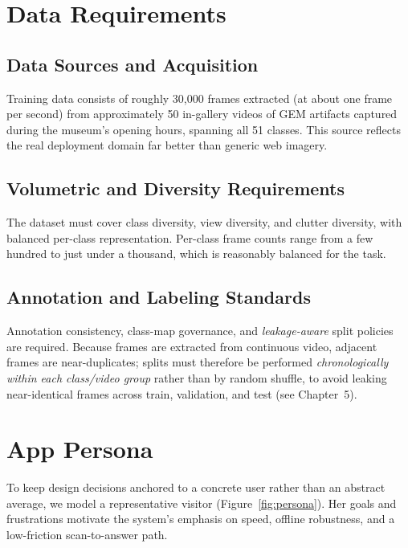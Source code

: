 \FloatBarrier
\section{Data Requirements}

\subsection{Data Sources and Acquisition}
Training data consists of roughly 30{,}000 frames extracted (at about one frame per
second) from approximately 50 in-gallery videos of GEM artifacts captured during
the museum's opening hours, spanning all 51 classes. This source reflects the real
deployment domain far better than generic web imagery.

\subsection{Volumetric and Diversity Requirements}
The dataset must cover class diversity, view diversity, and clutter diversity, with
balanced per-class representation. Per-class frame counts range from a few hundred to
just under a thousand, which is reasonably balanced for the task.

\subsection{Annotation and Labeling Standards}
Annotation consistency, class-map governance, and \emph{leakage-aware} split policies
are required. Because frames are extracted from continuous video, adjacent frames are
near-duplicates; splits must therefore be performed \emph{chronologically within each
class/video group} rather than by random shuffle, to avoid leaking near-identical
frames across train, validation, and test (see Chapter~5).

\section{App Persona}

To keep design decisions anchored to a concrete user rather than an abstract average,
we model a representative visitor (Figure~\ref{fig:persona}). Her goals and frustrations
motivate the system's emphasis on speed, offline robustness, and a low-friction
scan-to-answer path.

